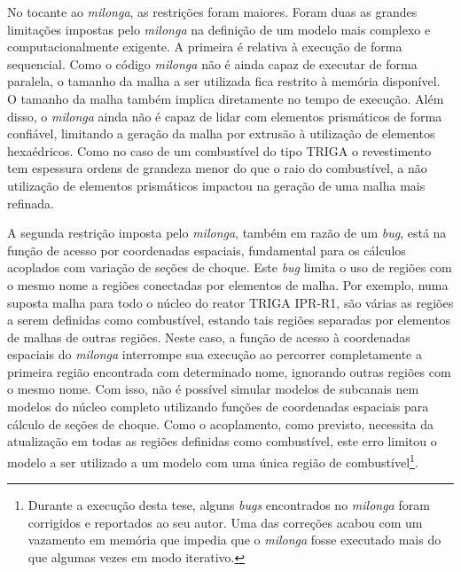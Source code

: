 No tocante ao \textit{milonga}, as restrições foram maiores. Foram duas as grandes limitações impostas
pelo \textit{milonga} na definição de um modelo mais complexo e computacionalmente exigente. A primeira
é relativa à execução de forma sequencial. Como o código \textit{milonga} não é ainda capaz de executar de
forma paralela, o tamanho da malha a ser utilizada fica restrito à memória disponível.
O tamanho da malha também implica diretamente no tempo de execução.
Além disso, o \textit{milonga} ainda não é capaz de lidar com elementos prismáticos de forma confiável, limitando a
geração da malha por extrusão à utilização de elementos hexaédricos.
Como no caso de um combustível do tipo TRIGA o revestimento tem espessura ordens de grandeza
menor do que o raio do combustível, a não utilização de elementos prismáticos impactou na geração
de uma malha mais refinada.

A segunda restrição imposta pelo \textit{milonga}, também em razão de um \textit{bug}, está na função
de acesso por coordenadas espaciais, fundamental para os cálculos acoplados com variação de seções de choque.
Este \textit{bug} limita o uso de regiões com o mesmo nome a regiões conectadas por elementos de malha.
Por exemplo, numa suposta malha para todo o núcleo do reator TRIGA IPR-R1, são várias as regiões a serem definidas
como combustível, estando
tais regiões separadas por elementos de malhas de outras regiões. Neste caso, a função de acesso
à coordenadas espaciais do \textit{milonga} interrompe sua execução ao percorrer completamente a primeira
região encontrada com determinado nome, ignorando outras regiões com o mesmo nome.
Com isso, não é possível simular modelos de subcanais
nem modelos do núcleo completo utilizando funções de coordenadas espaciais para cálculo de seções de choque.
Como o acoplamento, como previsto, necessita da atualização em todas as regiões definidas como combustível,
este erro limitou o modelo a ser utilizado a um modelo com uma única região de
combustível\footnote{Durante a execução desta tese, alguns \textit{bugs} encontrados
  no \textit{milonga} foram corrigidos e
  reportados ao seu autor. Uma das correções acabou com um vazamento em memória que impedia que o \textit{milonga}
  fosse executado mais do que algumas vezes em modo iterativo.}.





